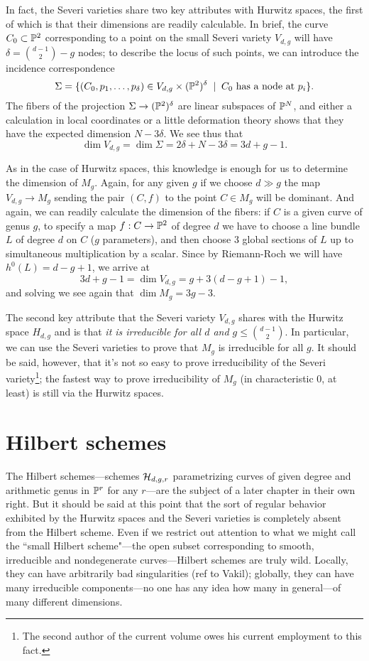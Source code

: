 In fact, the Severi varieties share two key attributes with Hurwitz spaces, the first of which is that their dimensions are readily calculable. In brief, the curve $C_0 \subset \PP^2$ corresponding to a point on the small Severi variety $V_{d,g}$ will have $\delta = \binom{d-1}{2} - g$ nodes; to describe the locus of such points, we can introduce the incidence correspondence
$$
\Sigma = \{(C_0,p_1,\dots,p_\delta) \in V_{d,g} \times (\PP^2)^\delta \; \mid \; C_0 \text{ has a node at $p_i$} \}.
$$
The fibers of the projection $\Sigma \to (\PP^2)^\delta$ are linear subspaces of $\PP^N$, and either a calculation in local coordinates or a little deformation theory shows that they have the expected dimension $N - 3\delta$. We see thus that
$$
\dim V_{d,g} = \dim \Sigma = 2\delta + N - 3\delta = 3d+g-1.
$$

As in the case of Hurwitz spaces, this knowledge is enough for us to determine the dimension of $M_g$. Again, for any given $g$ if we choose $d \gg g$ the map $V_{d,g} \to M_g$ sending the pair $(C, f)$ to the point $C \in M_g$ will be dominant. And again, we can readily calculate the dimension of the fibers: if $C$ is a given curve of genus $g$, to specify a map $f : C \to \PP^2$ of degree $d$ we have to choose a line bundle $L$ of degree $d$ on $C$ ($g$ parameters), and then choose 3 global sections of $L$ up to simultaneous multiplication by a scalar. Since by Riemann-Roch we will have $h^0(L) = d-g+1$, we arrive at
$$
3d+g-1 = \dim V_{d,g}  = g + 3(d-g+1) - 1,
$$
and solving we see again that $\dim M_g = 3g-3$.

The second key attribute that the Severi variety $V_{d,g}$ shares with the Hurwitz space $H_{d,g}$ and  is that \emph{it is irreducible for all $d$ and $g\leq \binom{d-1}{2}$}. In particular, we can use the Severi varieties to prove that $M_g$ is irreducible for all $g$. It should be said, however, that it's not so easy to prove irreducibility of the Severi variety\footnote{The second author of the current volume owes his current employment to this fact.}; the fastest way to prove irreducibility of $M_g$ (in characteristic 0, at least) is still via the Hurwitz spaces.

\section{Hilbert schemes}\label{hilbert scheme section}

The Hilbert schemes---schemes $\cH_{d,g,r}$ parametrizing curves of given degree and arithmetic genus in $\PP^r$ for any $r$---are the subject of a later chapter in their own right. But it should be said at this point that the sort of regular behavior exhibited by the Hurwitz spaces and the Severi varieties is completely absent from the Hilbert scheme. Even if we restrict out attention to  what we might call the ``small Hilbert scheme"---the open subset corresponding to smooth, irreducible and nondegenerate curves---Hilbert schemes are truly wild. Locally, they can have arbitrarily bad singularities (ref to Vakil); globally, they can have many irreducible components---no one has any idea how many in general---of many different dimensions.



